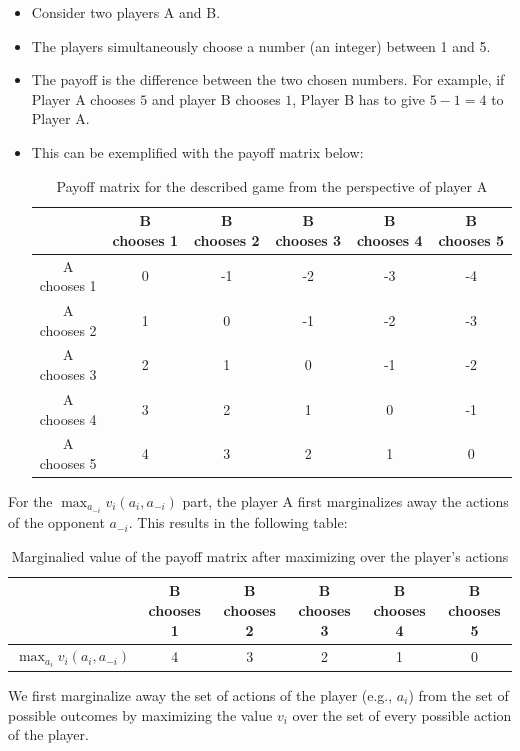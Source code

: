 \begin{itemize}
     \item Consider two players A and B.
     \item The players simultaneously choose a number (an integer) between 1 and 5.
     \item The payoff is the difference between the two chosen numbers. For example, if Player A chooses $5$ and player B chooses $1$, Player B has to give $5-1=4$ to Player A.
     \item This can be exemplified with the payoff matrix below:
     \begin{table}[!ht]
         \centering
         \begin{tabular}{|c|c|c|c|c|c|}\hline
               & B chooses 1 & B chooses 2 & B chooses 3 & B chooses 4 & B chooses 5  \\ \hline 
              A chooses 1 & 0 & -1& -2& -3&  -4 \\ \hline
              A chooses 2 & 1 & 0 & -1 & -2 & -3   \\ \hline
              A chooses 3 & 2 & 1 & 0 & -1 & -2  \\ \hline
              A chooses 4 & 3 & 2 & 1 & 0 &  -1 \\ \hline
              A chooses 5 & 4 & 3 & 2 & 1 & 0  \\ \hline
         \end{tabular}
         \caption{Payoff matrix for the described game from the perspective of player A}
         \label{tab:my_label}
     \end{table}
 \end{itemize}
For the $\max_{a_{-i}} v_i (a_i, a_{-i})$ part, the player A first marginalizes away the actions of the opponent $a_{-i}$. This results in the following table:

     \begin{table}[!ht]
         \centering
         \begin{tabular}{|c|c|c|c|c|c|}\hline
               & B chooses 1 & B chooses 2 & B chooses 3 & B chooses 4 & B chooses 5  \\ \hline 
              $\max_{a_i} v_i(a_i, a_{-i})$ & 4 & 3& 2& 1&  0 \\ \hline
         \end{tabular}
         \caption{Marginalied value of the payoff matrix after maximizing over the player's actions}
         \label{tab:my_label1}
     \end{table}

 We first marginalize away the set of actions of the player (e.g., $a_{i}$) from the set of possible outcomes by maximizing the value $v_i$ over the set of every possible action of the player. 
 
